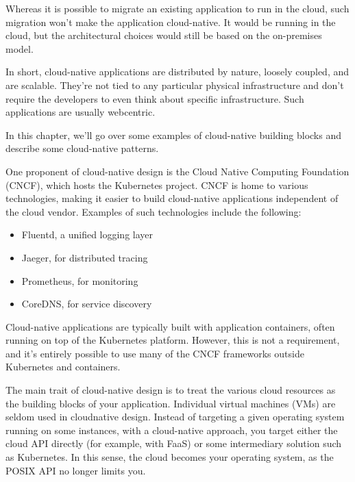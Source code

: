 

Whereas it is possible to migrate an existing application to run in the cloud, such migration won't make the application cloud-native. It would be running in the cloud, but the architectural choices would still be based on the on-premises model.

In short, cloud-native applications are distributed by nature, loosely coupled, and are scalable. They're not tied to any particular physical infrastructure and don't require the developers to even think about specific infrastructure. Such applications are usually webcentric.

In this chapter, we'll go over some examples of cloud-native building blocks and describe some cloud-native patterns.


One proponent of cloud-native design is the Cloud Native Computing Foundation (CNCF), which hosts the Kubernetes project. CNCF is home to various technologies, making it easier to build cloud-native applications independent of the cloud vendor. Examples of such technologies include the following:

\begin{itemize}
\item 
Fluentd, a unified logging layer

\item 
Jaeger, for distributed tracing

\item 
Prometheus, for monitoring

\item 
CoreDNS, for service discovery
\end{itemize}

Cloud-native applications are typically built with application containers, often running on top of the Kubernetes platform. However, this is not a requirement, and it's entirely possible to use many of the CNCF frameworks outside Kubernetes and containers.


The main trait of cloud-native design is to treat the various cloud resources as the building blocks of your application. Individual virtual machines (VMs) are seldom used in cloudnative design. Instead of targeting a given operating system running on some instances, with a cloud-native approach, you target either the cloud API directly (for example, with FaaS) or some intermediary solution such as Kubernetes. In this sense, the cloud becomes your operating system, as the POSIX API no longer limits you.

